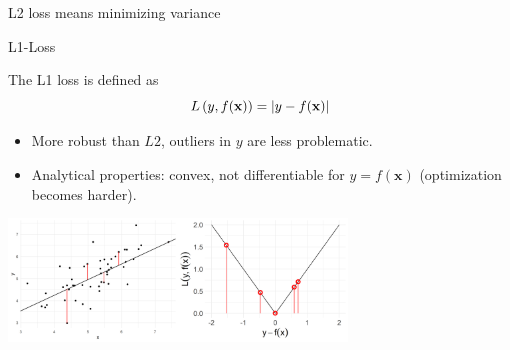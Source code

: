 \documentclass[11pt,compress,t,notes=noshow, xcolor=table]{beamer}
\begin{document}
\begin{vbframe}{L2 loss means minimizing variance}


\end{vbframe}

\begin{vbframe}{L1-Loss}

\vspace*{-0.1cm}
The L1 loss is defined as
$$
L\left(y, f(\mathbf{x})\right) = \left|y-f(\mathbf{x})\right|
$$

\begin{itemize}
\setlength{\itemsep}{1.5em}
\item More robust than $L2$, outliers in $y$ are less problematic.
\item Analytical properties: convex, not differentiable for $y = f(\bm{x})$ (optimization becomes harder).
\end{itemize}

\vspace*{0.2cm}

\begin{center}  \includegraphics[width = 9cm]{figure/loss_absolute_2.png} \\
\end{center}


\end{vbframe}
\end{document}
